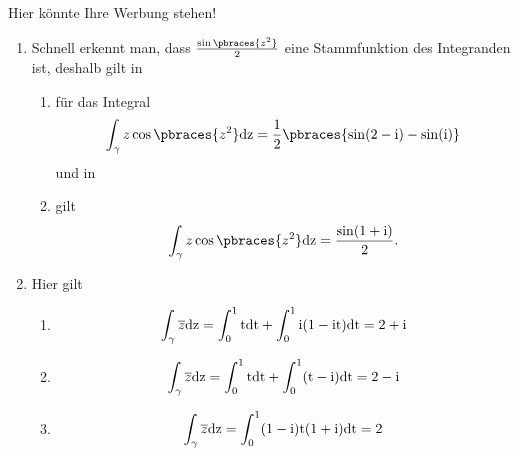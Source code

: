 \begin{solution}
    Hier könnte Ihre Werbung stehen!
    \begin{enumerate}[label = (\roman*)]
        \item Schnell erkennt man, dass $\frac{\sin\pbraces{z^2}}{2}$ eine Stammfunktion des Integranden ist, deshalb gilt in
        \begin{enumerate}[label = (\arabic*)]
            \item für das Integral
            \begin{align*}
                \int_\gamma z \cos\pbraces{z^2} \rm{d}z = \frac{1}{2}\pbraces{\sin(2 - \rm{i}) - \sin(i)}
            \end{align*}
            und in 
            \item gilt
            \begin{align*}
                \int_\gamma z \cos\pbraces{z^2} \rm{d}z = \frac{\sin(1 + i)}{2}.
            \end{align*}
        \end{enumerate}
        \item Hier gilt
        \begin{enumerate}[label = (\alph*)]
            \item 
            \begin{align*}
                \int_\gamma \overline{z} \rm{d}z = \int_0^1 t \rm{d}t +  \int_0^1 \rm{i}(1 - \rm{i}t) \rm{d}t = 2 + \rm{i}
            \end{align*}
            \item 
            \begin{align*}
                \int_\gamma \overline{z} \rm{d}z = \int_0^1 t \rm{d}t + \int_0^1 (t - \rm{i}) \rm{d}t = 2 - \rm{i}
            \end{align*}
            \item 
            \begin{align*}
                \int_\gamma \overline{z} \rm{d}z = \int_0^1 (1 - \rm{i})t(1 + \rm{i}) \rm{d}t = 2
            \end{align*}
        \end{enumerate}
    \end{enumerate}
    
\end{solution}